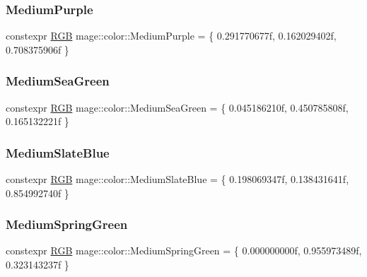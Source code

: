\mbox{\label{namespacemage_1_1color_a05a317af5ced870161013504175e18b8}} 
\subsubsection{\texorpdfstring{Medium\+Purple}{MediumPurple}}
{\footnotesize\ttfamily constexpr \mbox{\hyperlink{structmage_1_1_r_g_b}{R\+GB}} mage\+::color\+::\+Medium\+Purple = \{ 0.\+291770677f, 0.\+162029402f, 0.\+708375906f \}}

\mbox{\label{namespacemage_1_1color_a28991b5b9e22fa71e7554d315741da6c}} 
\subsubsection{\texorpdfstring{Medium\+Sea\+Green}{MediumSeaGreen}}
{\footnotesize\ttfamily constexpr \mbox{\hyperlink{structmage_1_1_r_g_b}{R\+GB}} mage\+::color\+::\+Medium\+Sea\+Green = \{ 0.\+045186210f, 0.\+450785808f, 0.\+165132221f \}}

\mbox{\label{namespacemage_1_1color_ac985e8c0e60c1a407ebb8190318e5f26}} 
\subsubsection{\texorpdfstring{Medium\+Slate\+Blue}{MediumSlateBlue}}
{\footnotesize\ttfamily constexpr \mbox{\hyperlink{structmage_1_1_r_g_b}{R\+GB}} mage\+::color\+::\+Medium\+Slate\+Blue = \{ 0.\+198069347f, 0.\+138431641f, 0.\+854992740f \}}

\mbox{\label{namespacemage_1_1color_ad301b4945f333081cdfe7e49e7db2bd3}} 
\subsubsection{\texorpdfstring{Medium\+Spring\+Green}{MediumSpringGreen}}
{\footnotesize\ttfamily constexpr \mbox{\hyperlink{structmage_1_1_r_g_b}{R\+GB}} mage\+::color\+::\+Medium\+Spring\+Green = \{ 0.\+000000000f, 0.\+955973489f, 0.\+323143237f \}}

